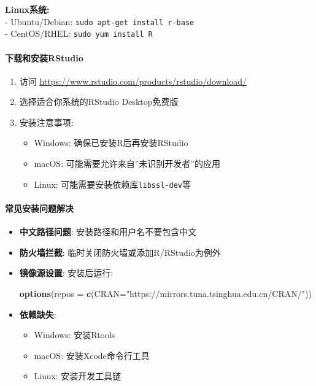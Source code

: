 \documentclass[
  twoside]{book}
\newenvironment{Shaded}{\begin{snugshade}}{\end{snugshade}}
\newcommand{\AttributeTok}[1]{\textcolor[rgb]{0.13,0.29,0.53}{#1}}
\newcommand{\FunctionTok}[1]{\textcolor[rgb]{0.13,0.29,0.53}{\textbf{#1}}}
\newcommand{\NormalTok}[1]{#1}
\newcommand{\StringTok}[1]{\textcolor[rgb]{0.31,0.60,0.02}{#1}}
\providecommand{\tightlist}{%
  \setlength{\itemsep}{0pt}\setlength{\parskip}{0pt}}
\begin{document}
\textbf{Linux系统:}\\
- Ubuntu/Debian: \texttt{sudo\ apt-get\ install\ r-base}\\
- CentOS/RHEL: \texttt{sudo\ yum\ install\ R}

\hypertarget{ux4e0bux8f7dux548cux5b89ux88c5rstudio}{%
\paragraph{下载和安装RStudio}\label{ux4e0bux8f7dux548cux5b89ux88c5rstudio}}

\begin{enumerate}
\def\labelenumi{\arabic{enumi}.}
\item
  访问 \url{https://www.rstudio.com/products/rstudio/download/}
\item
  选择适合你系统的RStudio Desktop免费版
\item
  安装注意事项:

  \begin{itemize}
  \tightlist
  \item
    Windows: 确保已安装R后再安装RStudio
  \item
    macOS: 可能需要允许来自''未识别开发者''的应用
  \item
    Linux: 可能需要安装依赖库\texttt{libssl-dev}等
  \end{itemize}
\end{enumerate}

\hypertarget{ux5e38ux89c1ux5b89ux88c5ux95eeux9898ux89e3ux51b3}{%
\paragraph{常见安装问题解决}\label{ux5e38ux89c1ux5b89ux88c5ux95eeux9898ux89e3ux51b3}}

\begin{itemize}
\item
  \textbf{中文路径问题}: 安装路径和用户名不要包含中文
\item
  \textbf{防火墙拦截}: 临时关闭防火墙或添加R/RStudio为例外
\item
  \textbf{镜像源设置}: 安装后运行:

\begin{Shaded}
\begin{Highlighting}[]
\FunctionTok{options}\NormalTok{(}\AttributeTok{repos =} \FunctionTok{c}\NormalTok{(}\AttributeTok{CRAN=}\StringTok{"https://mirrors.tuna.tsinghua.edu.cn/CRAN/"}\NormalTok{))}
\end{Highlighting}
\end{Shaded}
\item
  \textbf{依赖缺失}:

  \begin{itemize}
  \tightlist
  \item
    Windows: 安装Rtools
  \item
    macOS: 安装Xcode命令行工具
  \item
    Linux: 安装开发工具链
  \end{itemize}
\end{itemize}
\end{document}
